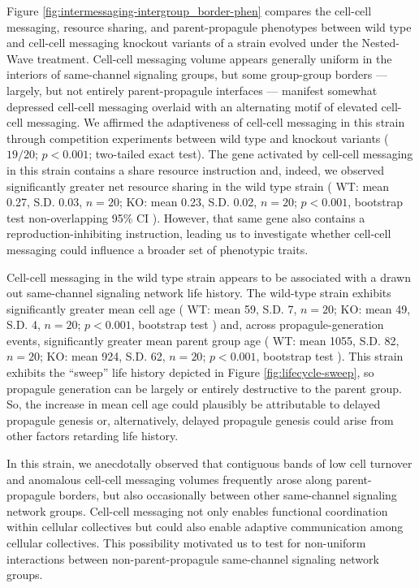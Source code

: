 Figure \ref{fig:intermessaging-intergroup_border-phen} compares the cell-cell messaging, resource sharing, and parent-propagule phenotypes between wild type and cell-cell messaging knockout variants of a strain evolved under the Nested-Wave treatment.
Cell-cell messaging volume appears generally uniform in the interiors of same-channel signaling groups, but some group-group borders --- largely, but not entirely parent-propagule interfaces --- manifest somewhat depressed cell-cell messaging overlaid with an alternating motif of elevated cell-cell messaging.
We affirmed the adaptiveness of cell-cell messaging in this strain through competition experiments between wild type and knockout variants ($19/20$; $p < 0.001$; two-tailed exact test).
The gene activated by cell-cell messaging in this strain contains a share resource instruction and, indeed, we observed significantly greater net resource sharing in the wild type strain
(%
WT: mean 0.27, S.D. 0.03, $n=20$;
KO: mean 0.23, S.D. 0.02, $n=20$;
$p < 0.001$, bootstrap test
non-overlapping 95\% CI%
). %
However, that same gene also contains a reproduction-inhibiting instruction, leading us to investigate whether cell-cell messaging could influence a broader set of phenotypic traits.

Cell-cell messaging in the wild type strain appears to be associated with a drawn out same-channel signaling network life history.
The wild-type strain exhibits significantly greater mean cell age
(%
WT: mean 59, S.D. 7, $n=20$;
KO: mean 49, S.D. 4, $n=20$;
$p < 0.001$, bootstrap test%
) %
and, across propagule-generation events, significantly greater mean parent group age
(%
WT: mean 1055, S.D. 82, $n=20$;
KO: mean 924, S.D. 62, $n=20$;
$p < 0.001$, bootstrap test%
). %
This strain exhibits the ``sweep'' life history depicted in Figure \ref{fig:lifecycle-sweep}, so propagule generation can be largely or entirely destructive to the parent group.
So, the increase in mean cell age could plausibly be attributable to delayed propagule genesis or, alternatively, delayed propagule genesis could arise from other factors retarding life history.

In this strain, we anecdotally observed that contiguous bands of low cell turnover and anomalous cell-cell messaging volumes frequently arose along parent-propagule borders, but also occasionally between other same-channel signaling network groups.
Cell-cell messaging not only enables functional coordination within cellular collectives but could also enable adaptive communication among cellular collectives.
This possibility motivated us to test for non-uniform interactions between non-parent-propagule same-channel signaling network groups.

